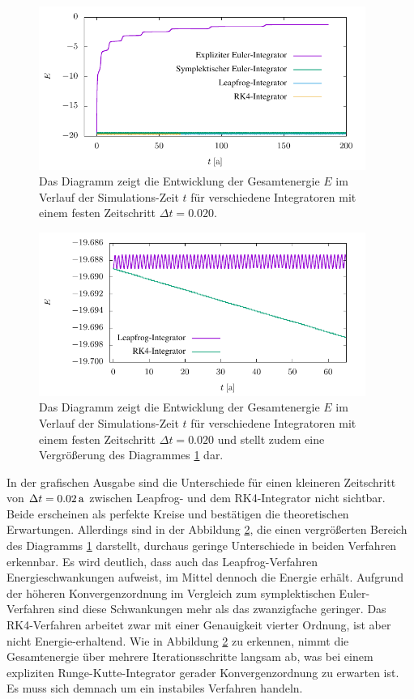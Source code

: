     \begin{figure}[p]
      \center
      \includegraphics[width=0.95\textwidth]{plots/sun_earth_2_plot.pdf}
      \caption{Das Diagramm zeigt die Entwicklung der Gesamtenergie $E$ im Verlauf der Simulations-Zeit $t$ für verschiedene Integratoren mit einem festen Zeitschritt $\Delta t = 0.020$.}
      \label{fig:e2}
    \end{figure}

    \begin{figure}[h]
      \center
      \includegraphics[width=0.95\textwidth]{plots/sun_earth_2_zoom_plot.pdf}
      \caption{Das Diagramm zeigt die Entwicklung der Gesamtenergie $E$ im Verlauf der Simulations-Zeit $t$ für verschiedene Integratoren mit einem festen Zeitschritt $\Delta t = 0.020$ und stellt zudem eine Vergrößerung des Diagrammes \ref{fig:e2} dar.}
      \label{fig:e2-zoom}
    \end{figure}

    In der grafischen Ausgabe sind die Unterschiede für einen kleineren Zeitschritt von $\Delta t = 0.02\,\mathrm{a}$ zwischen Leapfrog- und dem RK4-Integrator nicht sichtbar.
    Beide erscheinen als perfekte Kreise und bestätigen die theoretischen Erwartungen.
    Allerdings sind in der Abbildung \ref{fig:e2-zoom}, die einen vergrößerten Bereich des Diagramms \ref{fig:e2} darstellt, durchaus geringe Unterschiede in beiden Verfahren erkennbar.
    Es wird deutlich, dass auch das Leapfrog-Verfahren Energieschwankungen aufweist, im Mittel dennoch die Energie erhält.
    Aufgrund der höheren Konvergenzordnung im Vergleich zum symplektischen Euler-Verfahren sind diese Schwankungen mehr als das zwanzigfache geringer.
    Das RK4-Verfahren arbeitet zwar mit einer Genauigkeit vierter Ordnung, ist aber nicht Energie-erhaltend.
    Wie in Abbildung \ref{fig:e2-zoom} zu erkennen, nimmt die Gesamtenergie über mehrere Iterationsschritte langsam ab, was bei einem expliziten Runge-Kutte-Integrator gerader Konvergenzordnung zu erwarten ist.
    Es muss sich demnach um ein instabiles Verfahren handeln.

